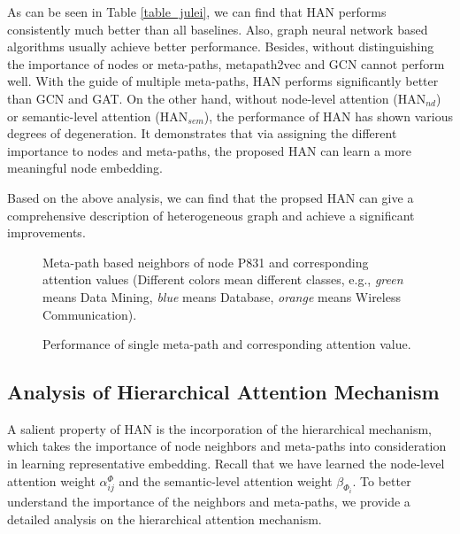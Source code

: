 As can be seen in Table \ref{table_julei}, we can find that HAN performs consistently much better than all baselines. Also, 
graph neural network based algorithms usually achieve better performance. 
Besides, without distinguishing the importance of nodes or meta-paths, 
metapath2vec and GCN cannot perform well.
With the guide of multiple meta-paths, HAN performs significantly better than GCN and GAT. 
On the other hand, without node-level attention (HAN$_{nd}$) or semantic-level attention (HAN$_{sem}$), the performance of HAN has shown various degrees of degeneration. It demonstrates that via assigning the different importance to nodes and meta-paths, the proposed HAN can learn a more meaningful node embedding. 

Based on the above analysis, we can find that the propsed HAN can give a comprehensive description of heterogeneous graph and achieve a significant improvements.


\begin{figure}
	\centering
{}
	\caption{Meta-path based neighbors of node P831 and corresponding attention values (Different colors mean different classes, e.g., \emph{green} means Data Mining, \emph{blue} means Database, \emph{orange} means Wireless Communication).}
	\label{fig_node_att}
\end{figure}



\begin{figure}
	\centering
{}
\caption{Performance of single meta-path and corresponding attention value.}
	\label{fig_att_metapath}
\end{figure}





\subsection{Analysis of Hierarchical Attention Mechanism}
A salient property of HAN is the incorporation of the hierarchical mechanism, 
which takes the importance of node neighbors and meta-paths into consideration in learning representative embedding. 
Recall that we have learned the node-level attention weight $\alpha^{\Phi}_{ij}$ and the semantic-level attention weight $\beta_{\Phi_i}$. To better understand the importance of the neighbors and meta-paths, we provide a detailed analysis on the hierarchical attention mechanism.

